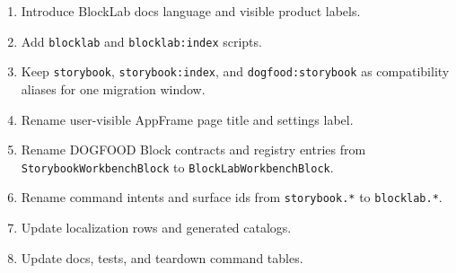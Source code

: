 \begin{enumerate}
\def\labelenumi{\arabic{enumi}.}
\tightlist
\item
  Introduce BlockLab docs language and visible product labels.
\item
  Add \texttt{b\allowbreak{}l\allowbreak{}o\allowbreak{}c\allowbreak{}k\allowbreak{}l\allowbreak{}a\allowbreak{}b} and \texttt{b\allowbreak{}l\allowbreak{}o\allowbreak{}c\allowbreak{}k\allowbreak{}l\allowbreak{}a\allowbreak{}b\allowbreak{}:\allowbreak{}i\allowbreak{}n\allowbreak{}d\allowbreak{}e\allowbreak{}x} scripts.
\item
  Keep \texttt{s\allowbreak{}t\allowbreak{}o\allowbreak{}r\allowbreak{}y\allowbreak{}b\allowbreak{}o\allowbreak{}o\allowbreak{}k}, \texttt{s\allowbreak{}t\allowbreak{}o\allowbreak{}r\allowbreak{}y\allowbreak{}b\allowbreak{}o\allowbreak{}o\allowbreak{}k\allowbreak{}:\allowbreak{}i\allowbreak{}n\allowbreak{}d\allowbreak{}e\allowbreak{}x}, and \texttt{d\allowbreak{}o\allowbreak{}g\allowbreak{}f\allowbreak{}o\allowbreak{}o\allowbreak{}d\allowbreak{}:\allowbreak{}s\allowbreak{}t\allowbreak{}o\allowbreak{}r\allowbreak{}y\allowbreak{}b\allowbreak{}o\allowbreak{}o\allowbreak{}k} as compatibility aliases for one migration window.
\item
  Rename user-visible AppFrame page title and settings label.
\item
  Rename DOGFOOD Block contracts and registry entries from \texttt{S\allowbreak{}t\allowbreak{}o\allowbreak{}r\allowbreak{}y\allowbreak{}b\allowbreak{}o\allowbreak{}o\allowbreak{}k\allowbreak{}W\allowbreak{}o\allowbreak{}r\allowbreak{}k\allowbreak{}b\allowbreak{}e\allowbreak{}n\allowbreak{}c\allowbreak{}h\allowbreak{}B\allowbreak{}l\allowbreak{}o\allowbreak{}c\allowbreak{}k} to \texttt{B\allowbreak{}l\allowbreak{}o\allowbreak{}c\allowbreak{}k\allowbreak{}L\allowbreak{}a\allowbreak{}b\allowbreak{}W\allowbreak{}o\allowbreak{}r\allowbreak{}k\allowbreak{}b\allowbreak{}e\allowbreak{}n\allowbreak{}c\allowbreak{}h\allowbreak{}B\allowbreak{}l\allowbreak{}o\allowbreak{}c\allowbreak{}k}.
\item
  Rename command intents and surface ids from \texttt{s\allowbreak{}t\allowbreak{}o\allowbreak{}r\allowbreak{}y\allowbreak{}b\allowbreak{}o\allowbreak{}o\allowbreak{}k\allowbreak{}.\allowbreak{}*} to \texttt{b\allowbreak{}l\allowbreak{}o\allowbreak{}c\allowbreak{}k\allowbreak{}l\allowbreak{}a\allowbreak{}b\allowbreak{}.\allowbreak{}*}.
\item
  Update localization rows and generated catalogs.
\item
  Update docs, tests, and teardown command tables.
\end{enumerate}

